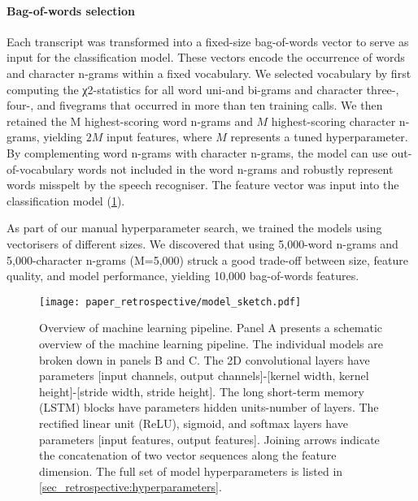 {\begin{table}
{\begin{tabular}{l|l|l}
        \bottomrule
    \end{tabular}%
    \vspace{-2mm}
    }
\end{table}


\paragraph{Bag-of-words selection}

Each transcript was transformed into a fixed-size bag-of-words vector to serve as input for the classification model. These vectors encode the occurrence of words and character n-grams within a fixed vocabulary. We selected vocabulary by first computing the χ2-statistics for all word uni-and bi-grams and character three-, four-, and fivegrams that occurred in more than ten training calls. We then retained the M highest-scoring word n-grams and $M$ highest-scoring character n-grams, yielding $2M$ input features, where $M$ represents a tuned hyperparameter. By complementing word n-grams with character n-grams, the model can use out-of-vocabulary words not included in the word n-grams and robustly represent words misspelt by the speech recogniser. The feature vector was input into the classification model (\cref{fig_retrospective:model_sketch}).

As part of our manual hyperparameter search, we trained the models using vectorisers of different sizes. We discovered that using 5,000-word n-grams and 5,000-character n-grams (M=5,000) struck a good trade-off between size, feature quality, and model performance, yielding 10,000 bag-of-words features.

\begin{figure}[t]
    \centering
    \texttt{[image: paper\_retrospective/model\_sketch.pdf]}
    \caption[Overview of machine learning pipeline for stroke recognition.]{Overview of machine learning pipeline. Panel A presents a schematic overview of the machine learning pipeline. The individual models are broken down in panels B and C. The 2D convolutional layers have parameters [input channels, output channels]-[kernel width, kernel height]-[stride width, stride height]. The long short-term memory (LSTM) blocks have parameters hidden units-number of layers. The rectified linear unit (ReLU), sigmoid, and softmax layers have parameters [input features, output features]. Joining arrows indicate the concatenation of two vector sequences along the feature dimension. The full set of model hyperparameters is listed in \cref{sec_retrospective:hyperparameters}.}
    \label{fig_retrospective:model_sketch}
\end{figure}

}
